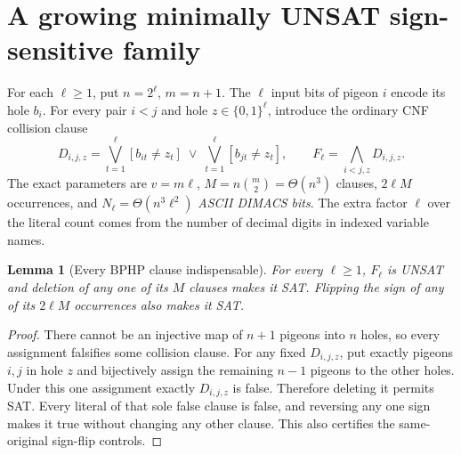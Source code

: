 \documentclass[11pt]{article}
\newtheorem{lemma}{Lemma}
\begin{document}
\section{A growing minimally UNSAT sign-sensitive family}
For each $\ell\ge1$, put $n=2^\ell$, $m=n+1$. The $\ell$ input bits of pigeon $i$ encode its hole $b_i$. For every pair $i<j$ and hole $z\in\{0,1\}^\ell$, introduce the ordinary CNF collision clause
\[
D_{i,j,z}=\bigvee_{t=1}^\ell[b_{it}\ne z_t]\;\vee\;\bigvee_{t=1}^\ell[b_{jt}\ne z_t],
\qquad F_\ell=\bigwedge_{i<j,z}D_{i,j,z}.
\]
The exact parameters are $v=m\ell$, $M=n\binom{m}{2}=\Theta(n^3)$ clauses, $2\ell M$ occurrences, and $N_\ell=\Theta(n^3\ell^2)$ \emph{ASCII DIMACS bits}. The extra factor $\ell$ over the literal count comes from the number of decimal digits in indexed variable names.

\begin{lemma}[Every BPHP clause indispensable]
For every $\ell\ge1$, $F_\ell$ is UNSAT and deletion of any one of its $M$ clauses makes it SAT. Flipping the sign of any of its $2\ell M$ occurrences also makes it SAT.
\end{lemma}
\begin{proof}
There cannot be an injective map of $n+1$ pigeons into $n$ holes, so every assignment falsifies some collision clause. For any fixed $D_{i,j,z}$, put exactly pigeons $i,j$ in hole $z$ and bijectively assign the remaining $n-1$ pigeons to the other holes. Under this one assignment exactly $D_{i,j,z}$ is false. Therefore deleting it permits SAT. Every literal of that sole false clause is false, and reversing any one sign makes it true without changing any other clause. This also certifies the same-original sign-flip controls.
\end{proof}
\end{document}
